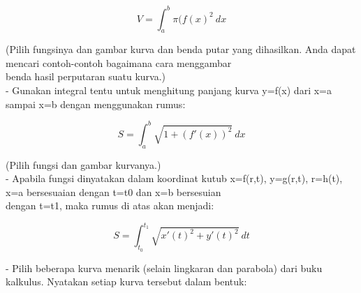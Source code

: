 \documentclass[12pt,Times new roman,letterpaper]{book}
\begin{document}
\begin{eulernootebook}
\begin{eulercomment}
\begin{eulercomment}
\begin{eulernootebook}
\begin{eulercomment}
\begin{eulercomment}
\begin{eulercomment}
\begin{eulercomment}
\begin{eulercomment}
\begin{eulercomment}
\begin{eulernotebook}
\begin{eulercomment}
\begin{eulercomment}
\begin{eulercomment}
\begin{eulercomment}
\begin{eulercomment}
\begin{eulercomment}
\begin{eulercomment}
\begin{eulercomment}
\begin{eulercomment}
\begin{eulercomment}
\begin{eulercomment}
\begin{eulercomment}
\begin{eulercomment}
\begin{eulercomment}
\begin{eulercomment}
\begin{eulercomment}
\begin{eulercomment}
\begin{eulercomment}
\begin{eulercomment}
\begin{eulercomment}
\begin{eulercomment}
\begin{eulercomment}
\begin{eulercomment}
\end{eulercomment}
\begin{eulerformula}
\[
V = \int_a^b \pi (f(x)^2\ dx
\]
\end{eulerformula}
\begin{eulercomment}
(Pilih fungsinya dan gambar kurva dan benda putar yang dihasilkan.
Anda dapat mencari contoh-contoh bagaimana cara menggambar\\
benda hasil perputaran suatu kurva.)\\
- Gunakan integral tentu untuk menghitung panjang kurva y=f(x) dari
x=a sampai x=b dengan menggunakan rumus:

\end{eulercomment}
\begin{eulerformula}
\[
S = \int_a^b \sqrt{1+(f'(x))^2} \ dx
\]
\end{eulerformula}
\begin{eulercomment}
(Pilih fungsi dan gambar kurvanya.)\\
- Apabila fungsi dinyatakan dalam koordinat kutub x=f(r,t), y=g(r,t),
r=h(t), x=a bersesuaian dengan t=t0 dan x=b bersesuian\\
dengan t=t1, maka rumus di atas akan menjadi:

\end{eulercomment}
\begin{eulerformula}
\[
S=\int_{t_0}^{t_1} \sqrt{x'(t)^2+y'(t)^2}\ dt
\]
\end{eulerformula}
\begin{eulercomment}
- Pilih beberapa kurva menarik (selain lingkaran dan parabola) dari
buku  kalkulus. Nyatakan setiap kurva tersebut dalam bentuk:


\end{eulercomment}
\end{eulercomment}
\end{eulercomment}
\end{eulercomment}
\end{eulercomment}
\end{eulercomment}
\end{eulercomment}
\end{eulercomment}
\end{eulercomment}
\end{eulercomment}
\end{eulercomment}
\end{eulercomment}
\end{eulercomment}
\end{eulercomment}
\end{eulercomment}
\end{eulercomment}
\end{eulercomment}
\end{eulercomment}
\end{eulercomment}
\end{eulercomment}
\end{eulercomment}
\end{eulercomment}
\end{eulercomment}
\end{eulernotebook}
\end{eulercomment}
\end{eulercomment}
\end{eulercomment}
\end{eulercomment}
\end{eulercomment}
\end{eulercomment}
\end{eulernootebook}
\end{eulercomment}
\end{eulercomment}
\end{eulernootebook}
\end{document}
